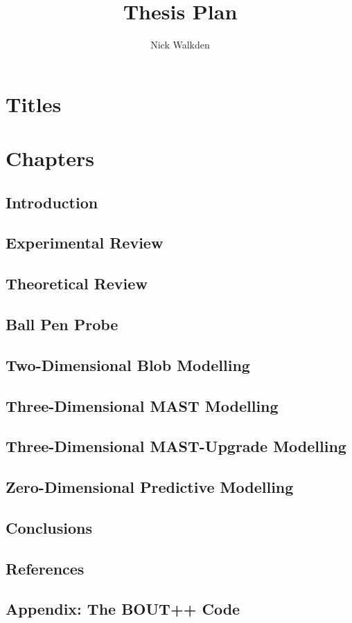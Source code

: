 \documentclass[11pt]{article}
\begin{document}
\title{Thesis Plan}
\author{Nick Walkden}
\date{}
\maketitle


\section{Titles}

\section{Chapters}

\subsection{Introduction}
\subsection{Experimental Review}
\subsection{Theoretical Review}
\subsection{Ball Pen Probe}
\subsection{Two-Dimensional Blob Modelling}
\subsection{Three-Dimensional MAST Modelling}
\subsection{Three-Dimensional MAST-Upgrade Modelling}
\subsection{Zero-Dimensional Predictive Modelling}
\subsection{Conclusions}
\subsection{References}
\subsection{Appendix: The BOUT++ Code}
\end{document}
